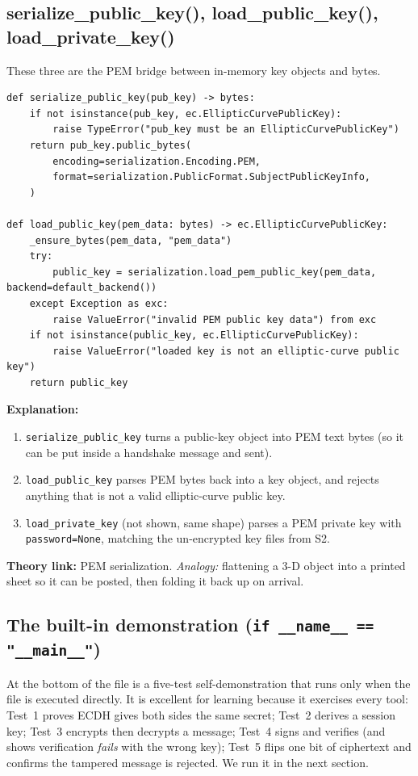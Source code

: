 \documentclass[11pt,a4paper]{report}
\begin{document}
\subsection{serialize\_public\_key(), load\_public\_key(), load\_private\_key()}
These three are the PEM bridge between in-memory key objects and bytes.
\begin{lstlisting}[style=py,caption={crypto.py --- PEM serialization helpers.}]
def serialize_public_key(pub_key) -> bytes:
    if not isinstance(pub_key, ec.EllipticCurvePublicKey):
        raise TypeError("pub_key must be an EllipticCurvePublicKey")
    return pub_key.public_bytes(
        encoding=serialization.Encoding.PEM,
        format=serialization.PublicFormat.SubjectPublicKeyInfo,
    )

def load_public_key(pem_data: bytes) -> ec.EllipticCurvePublicKey:
    _ensure_bytes(pem_data, "pem_data")
    try:
        public_key = serialization.load_pem_public_key(pem_data, backend=default_backend())
    except Exception as exc:
        raise ValueError("invalid PEM public key data") from exc
    if not isinstance(public_key, ec.EllipticCurvePublicKey):
        raise ValueError("loaded key is not an elliptic-curve public key")
    return public_key
\end{lstlisting}
\textbf{Explanation:}
\begin{enumerate}
  \item \texttt{serialize\_public\_key} turns a public-key object into PEM text
        bytes (so it can be put inside a handshake message and sent).
  \item \texttt{load\_public\_key} parses PEM bytes back into a key object, and
        rejects anything that is not a valid elliptic-curve public key.
  \item \texttt{load\_private\_key} (not shown, same shape) parses a PEM private
        key with \texttt{password=None}, matching the un-encrypted key files from
        S2.
\end{enumerate}
\textbf{Theory link:} PEM serialization. \emph{Analogy:} flattening a 3-D object
into a printed sheet so it can be posted, then folding it back up on arrival.

\subsection{The built-in demonstration (\texttt{if \_\_name\_\_ == "\_\_main\_\_"})}
At the bottom of the file is a five-test self-demonstration that runs only when
the file is executed directly. It is excellent for learning because it exercises
every tool: Test~1 proves ECDH gives both sides the same secret; Test~2 derives a
session key; Test~3 encrypts then decrypts a message; Test~4 signs and verifies
(and shows verification \emph{fails} with the wrong key); Test~5 flips one bit of
ciphertext and confirms the tampered message is rejected. We run it in the next
section.
\end{document}
